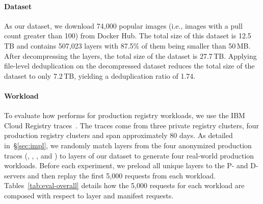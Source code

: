\paragraph{Dataset}
%
As our dataset, we download 74,000 popular images (i.e., images with a pull count greater than 100) from Docker Hub.
% 
The total size of this dataset is 12.5\,TB and contains 507,023 layers with 87.5\% of them being smaller than 50\,MB.
%
After decompressing the layers, the total size of the dataset is 27.7\,TB.
%
Applying file-level deduplication on the decompressed dataset
reduces the total size of the dataset to only 7.2\,TB, yielding 
a deduplication ratio of 1.74.
%
%
  
\paragraph{Workload}
%
To evaluate how \sysname performs for production registry workloads, 
we use the IBM Cloud Registry traces~\cite{dockerworkload}.
%
The traces come from three private registry clusters, 
four production registry clusters and span approximately 80 days.
%
As detailed in~\S\ref{sec:impl}, we randomly match layers from the four anonymized production
traces (\dal, \fra, \lon, and \syd) to layers of our dataset to generate four real-world production workloads.
%
Before each experiment, we preload all unique layers to the P- and D-servers
and then replay the first 5,000 requests from each workload.
%
%
Tables~\ref{tab:eval-overall} details how the 5,000 requests for each workload are composed
with respect to layer and manifest requests.

